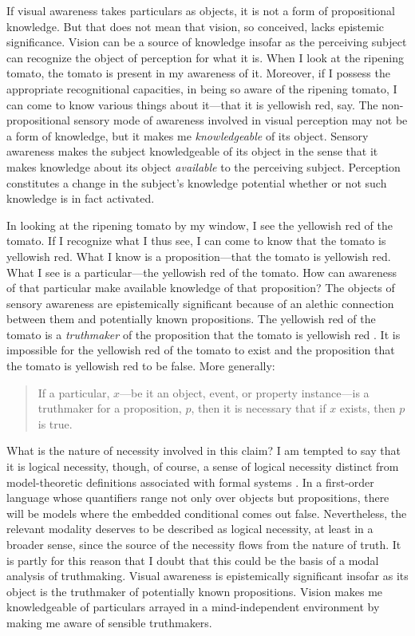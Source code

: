 \documentclass[12pt]{article}
\begin{document}
If visual awareness takes particulars as objects, it is not a form of propositional knowledge. But that does not mean that vision, so conceived, lacks epistemic significance. Vision can be a source of knowledge insofar as the perceiving subject can recognize the object of perception for what it is. When I look at the ripening tomato, the tomato is present in my awareness of it. Moreover, if I possess the appropriate recognitional capacities, in being so aware of the ripening tomato, I can come to know various things about it---that it is yellowish red, say. The non-propositional sensory mode of awareness involved in visual perception may not be a form of knowledge, but it makes me \emph{knowledgeable} of its object. Sensory awareness makes the subject knowledgeable of its object in the sense that it makes knowledge about its object \emph{available} to the perceiving subject. Perception constitutes a change in the subject's knowledge potential whether or not such knowledge is in fact activated.

In looking at the ripening tomato by my window, I see the yellowish red of the tomato. If I recognize what I thus see, I can come to know that the tomato is yellowish red. What I know is a proposition---that the tomato is yellowish red. What I see is a particular---the yellowish red of the tomato. How can awareness of that particular make available knowledge of that proposition? The objects of sensory awareness are epistemically significant because of an alethic connection between them and potentially known propositions. The yellowish red of the tomato is a \emph{truthmaker} of the proposition that the tomato is yellowish red \citep[see][]{Johnston:2006uq}. It is impossible for the yellowish red of the tomato to exist and the proposition that the tomato is yellowish red to be false. More generally:
\begin{quote}
	If a particular, \( x \)---be it an object, event, or property instance---is a truthmaker for a proposition, \( p \), then it is necessary that if \( x \) exists, then \( p \) is true. 
\end{quote}
What is the nature of necessity involved in this claim? I am tempted to say that it is logical necessity, though, of course, a sense of logical necessity distinct from model-theoretic definitions associated with formal systems  \citep[for doubts about model-theoretic definitions of logical necessity see][]{Etchemendy:1988et,Etchemendy:1988sa}. In a first-order language whose quantifiers range not only over objects but propositions, there will be models where the embedded conditional comes out false. Nevertheless, the relevant modality deserves to be described as logical necessity, at least in a broader sense, since the source of the necessity flows from the nature of truth. It is partly for this reason that I doubt that this could be the basis of a modal analysis of truthmaking. Visual awareness is epistemically significant insofar as its object is the truthmaker of potentially known propositions. Vision makes me knowledgeable of particulars arrayed in a mind-independent environment by making me aware of sensible truthmakers.
\end{document}
